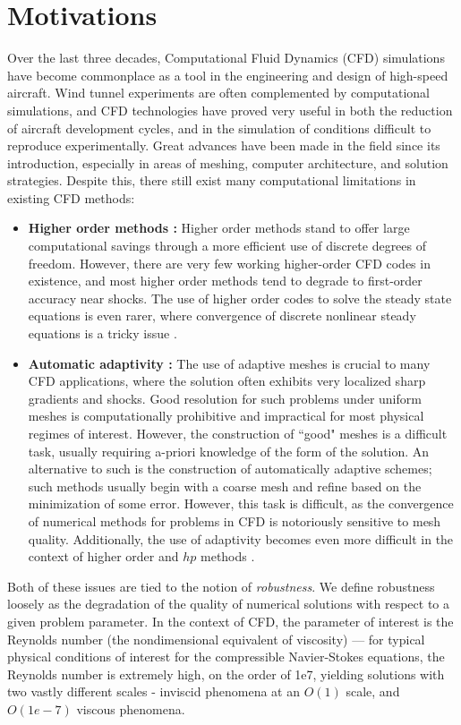 
\section{Motivations}

Over the last three decades, Computational Fluid Dynamics (CFD) simulations have become commonplace as a tool in the engineering and design of high-speed aircraft.  Wind tunnel experiments are often complemented by computational simulations, and CFD technologies have proved very useful in both the reduction of aircraft development cycles, and in the simulation of conditions difficult to reproduce experimentally.  Great advances have been made in the field since its introduction, especially in areas of meshing, computer architecture, and solution strategies.  Despite this, there still exist many computational limitations in existing CFD methods:  
\begin{itemize}
\item \textbf{Higher order methods :} Higher order methods stand to offer large computational savings through a more efficient use of discrete degrees of freedom.  However, there are very few working higher-order CFD codes in existence, and most higher order methods tend to degrade to first-order accuracy near shocks. The use of higher order codes to solve the steady state equations is even rarer, where convergence of discrete nonlinear steady equations is a tricky issue \cite{BoeingHigherOrder}.  
\item \textbf{Automatic adaptivity :} The use of adaptive meshes is crucial to many CFD applications, where the solution often exhibits very localized sharp gradients and shocks.  Good resolution for such problems under uniform meshes is computationally prohibitive and impractical for most physical regimes of interest.  However, the construction of ``good" meshes is a difficult task, usually requiring a-priori knowledge of the form of the solution.  An alternative to such is the construction of automatically adaptive schemes; such methods usually begin with a coarse mesh and refine based on the minimization of some error.  However, this task is difficult, as the convergence of numerical methods for problems in CFD is notoriously sensitive to mesh quality.  Additionally, the use of adaptivity becomes even more difficult in the context of higher order and $hp$ methods \cite{BoeingHigherOrder}.  
\end{itemize}
Both of these issues are tied to the notion of \emph{robustness}.  We define robustness loosely as the degradation of the quality of numerical solutions with respect to a given problem parameter.  In the context of CFD, the parameter of interest is the Reynolds number (the nondimensional equivalent of viscosity) --- for typical physical conditions of interest for the compressible Navier-Stokes equations, the Reynolds number is extremely high, on the order of 1e7, yielding solutions with two vastly different scales - inviscid phenomena at an $O(1)$ scale, and $O(1e-7)$ viscous phenomena.  

